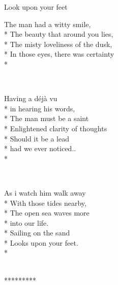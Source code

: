 \documentclass[a4paper]{article}
\begin{document}
\begin{poem}{Look upon your feet}{}
\begin{altverse}
The man had a witty smile,\\*
The beauty that around you lies,\\*
The misty loveliness of the dusk,\\*
In those eyes, there was certainty\\*
\end{altverse}
\\
\begin{altverse}
Having a déjà vu\\*
in hearing his words,\\*
The man must be a saint\\*
Enlightened clarity of thoughts\\*
Should it be a lead\\*
had we ever noticed..\\*
\end{altverse}
\\
\begin{altverse}
As i watch him walk away\\*
With those tides nearby,\\*
The open sea waves more\\*
into our life.\\*
Sailing on the sand\\*
Looks upon your feet.\\*
\end{altverse}
\\\hspace{15mm}
*********

\end{poem}
\end{document}
